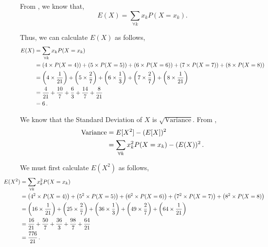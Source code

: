 \begin{subquestions}
\begin{subsubquestions}

\subsubquestion

From , we know that,
\begin{equation}
	E(X)= \sum_{\forall k} x_k P(X=x_k). 
\end{equation}

Thus, we can calculate $E(X)$ as follows,
\begin{align}
	E(X) & = \sum_{\forall k} x_k P(X=x_k) \nonumber \\
	     & = \left(4 \times P(X=4)\right) + \left(5 \times P(X=5)\right) + \left(6 \times P(X=6)\right) + \left(7 \times P(X=7)\right) + \left(8 \times P(X=8) \right) \nonumber \\
	     & = \left(4 \times \frac{1}{21}\right) + \left(5 \times \frac{2}{7}\right) + \left(6 \times \frac{1}{3}\right) + \left(7 \times \frac{2}{7}\right) + \left(8 \times \frac{1}{21} \right) \nonumber \\
	     & = \frac{4}{21} + \frac{10}{7} + \frac{6}{3} + \frac{14}{7} + \frac{8}{21} \nonumber \\
	     & = 6\,.
\end{align}


\subsubquestion

We know that the Standard Deviation of $X$ is $\sqrt{\text{Variance}}$. From , 
\begin{align}
	\text{Variance} & = E[X^2] - (E[X])^2 \nonumber \\
	           & = \sum_{\forall k} x_k^2 P(X=x_k) - (E(X))^2 \,.
\end{align}

We must first calculate $E(X^2)$ as follows,
\begin{align}
	\hspace{-100pt}
	E(X^2) & = \sum_{\forall k} x_k^2 P(X=x_k) \nn \\
	       & = \left(4^2 \times P(X=4)\right) + \left(5^2 \times P(X=5)\right) + \left(6^2 \times P(X=6)\right) + \left(7^2 \times P(X=7)\right) + \left(8^2 \times P(X=8) \right) \nn \\
	       & = \left(16 \times \frac{1}{21}\right) + \left(25 \times \frac{2}{7}\right) + \left(36 \times \frac{1}{3}\right) + \left(49 \times \frac{2}{7}\right) + \left(64 \times \frac{1}{21} \right) \nn \\
	       & = \frac{16}{21} + \frac{50}{7} + \frac{36}{3} + \frac{98}{7} + \frac{64}{21} \nn \\
	       & = \frac{776}{21} \,.
\end{align}


\end{subsubquestions}
\end{subquestions}

